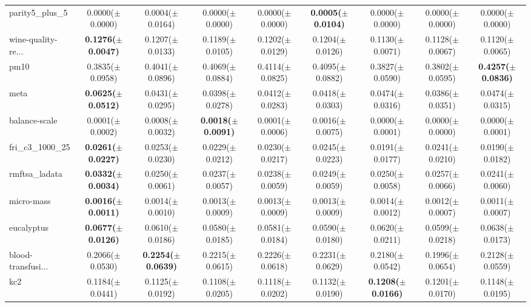 \begin{longtable}{lcccccccc}
parity5\_plus\_5 & 0.0000($\pm$0.0000) & 0.0004($\pm$0.0164) & 0.0000($\pm$0.0000) & 0.0000($\pm$0.0000) & \textbf{0.0005($\pm$0.0104)} & 0.0000($\pm$0.0000) & 0.0000($\pm$0.0000) & 0.0000($\pm$0.0000) \\
wine-quality-re... & \textbf{0.1276($\pm$0.0047)} & 0.1207($\pm$0.0133) & 0.1189($\pm$0.0105) & 0.1202($\pm$0.0129) & 0.1204($\pm$0.0126) & 0.1130($\pm$0.0071) & 0.1128($\pm$0.0067) & 0.1120($\pm$0.0065) \\
pm10 & 0.3835($\pm$0.0958) & 0.4041($\pm$0.0896) & 0.4069($\pm$0.0884) & 0.4114($\pm$0.0825) & 0.4095($\pm$0.0882) & 0.3827($\pm$0.0590) & 0.3802($\pm$0.0595) & \textbf{0.4257($\pm$0.0836)} \\
meta & \textbf{0.0625($\pm$0.0512)} & 0.0431($\pm$0.0295) & 0.0398($\pm$0.0278) & 0.0412($\pm$0.0283) & 0.0418($\pm$0.0303) & 0.0474($\pm$0.0316) & 0.0386($\pm$0.0351) & 0.0474($\pm$0.0315) \\
balance-scale & 0.0001($\pm$0.0002) & 0.0008($\pm$0.0032) & \textbf{0.0018($\pm$0.0091)} & 0.0001($\pm$0.0006) & 0.0016($\pm$0.0075) & 0.0000($\pm$0.0001) & 0.0000($\pm$0.0000) & 0.0000($\pm$0.0001) \\
fri\_c3\_1000\_25 & \textbf{0.0261($\pm$0.0227)} & 0.0253($\pm$0.0230) & 0.0229($\pm$0.0212) & 0.0230($\pm$0.0217) & 0.0245($\pm$0.0223) & 0.0191($\pm$0.0177) & 0.0241($\pm$0.0210) & 0.0190($\pm$0.0182) \\
rmftsa\_ladata & \textbf{0.0332($\pm$0.0034)} & 0.0250($\pm$0.0061) & 0.0237($\pm$0.0057) & 0.0238($\pm$0.0059) & 0.0249($\pm$0.0059) & 0.0250($\pm$0.0058) & 0.0257($\pm$0.0066) & 0.0241($\pm$0.0060) \\
micro-mass & \textbf{0.0016($\pm$0.0011)} & 0.0014($\pm$0.0010) & 0.0013($\pm$0.0009) & 0.0013($\pm$0.0009) & 0.0013($\pm$0.0009) & 0.0014($\pm$0.0012) & 0.0012($\pm$0.0007) & 0.0011($\pm$0.0007) \\
eucalyptus & \textbf{0.0677($\pm$0.0126)} & 0.0610($\pm$0.0186) & 0.0580($\pm$0.0185) & 0.0581($\pm$0.0184) & 0.0590($\pm$0.0180) & 0.0620($\pm$0.0211) & 0.0599($\pm$0.0218) & 0.0638($\pm$0.0173) \\
blood-transfusi... & 0.2066($\pm$0.0530) & \textbf{0.2254($\pm$0.0639)} & 0.2215($\pm$0.0615) & 0.2226($\pm$0.0618) & 0.2231($\pm$0.0629) & 0.2180($\pm$0.0542) & 0.1996($\pm$0.0654) & 0.2128($\pm$0.0559) \\
kc2 & 0.1184($\pm$0.0441) & 0.1125($\pm$0.0192) & 0.1108($\pm$0.0205) & 0.1118($\pm$0.0202) & 0.1132($\pm$0.0190) & \textbf{0.1208($\pm$0.0166)} & 0.1201($\pm$0.0170) & 0.1148($\pm$0.0195) \\

\end{longtable}

